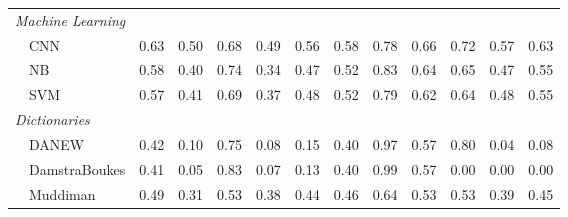 \begin{tabularx}{\textwidth}{lXXrrrrrrrrrrr}
\multicolumn{11}{l}{\emph{ Machine Learning }} \\

 & \multicolumn{2}{l}{ CNN }& \cellcolor[gray]{0.68} 0.63& \cellcolor[gray]{0.75} 0.50& \cellcolor[gray]{0.66} 0.68& \cellcolor[gray]{0.76} 0.49& \cellcolor[gray]{0.72} 0.56& \cellcolor[gray]{0.71} 0.58& \cellcolor[gray]{0.61} 0.78& \cellcolor[gray]{0.67} 0.66& \cellcolor[gray]{0.64} 0.72& \cellcolor[gray]{0.71} 0.57& \cellcolor[gray]{0.68} 0.63\\

 & \multicolumn{2}{l}{ NB }& \cellcolor[gray]{0.71} 0.58& \cellcolor[gray]{0.80} 0.40& \cellcolor[gray]{0.63} 0.74& \cellcolor[gray]{0.83} 0.34& \cellcolor[gray]{0.77} 0.47& \cellcolor[gray]{0.74} 0.52& \cellcolor[gray]{0.58} 0.83& \cellcolor[gray]{0.68} 0.64& \cellcolor[gray]{0.67} 0.65& \cellcolor[gray]{0.76} 0.47& \cellcolor[gray]{0.73} 0.55\\

 & \multicolumn{2}{l}{ SVM }& \cellcolor[gray]{0.71} 0.57& \cellcolor[gray]{0.80} 0.41& \cellcolor[gray]{0.65} 0.69& \cellcolor[gray]{0.82} 0.37& \cellcolor[gray]{0.76} 0.48& \cellcolor[gray]{0.74} 0.52& \cellcolor[gray]{0.61} 0.79& \cellcolor[gray]{0.69} 0.62& \cellcolor[gray]{0.68} 0.64& \cellcolor[gray]{0.76} 0.48& \cellcolor[gray]{0.72} 0.55\\


\multicolumn{11}{l}{\emph{ Dictionaries }} \\

 & \multicolumn{2}{l}{ DANEW }& \cellcolor[gray]{0.79} 0.42& \cellcolor[gray]{0.95} 0.10& \cellcolor[gray]{0.62} 0.75& \cellcolor[gray]{0.96} 0.08& \cellcolor[gray]{0.93} 0.15& \cellcolor[gray]{0.80} 0.40& \cellcolor[gray]{0.51} 0.97& \cellcolor[gray]{0.72} 0.57& \cellcolor[gray]{0.60} 0.80& \cellcolor[gray]{0.98} 0.04& \cellcolor[gray]{0.96} 0.08\\

 & \multicolumn{2}{l}{ DamstraBoukes }& \cellcolor[gray]{0.80} 0.41& \cellcolor[gray]{0.97} 0.05& \cellcolor[gray]{0.58} 0.83& \cellcolor[gray]{0.97} 0.07& \cellcolor[gray]{0.94} 0.13& \cellcolor[gray]{0.80} 0.40& \cellcolor[gray]{0.50} 0.99& \cellcolor[gray]{0.72} 0.57& \cellcolor[gray]{1.00} 0.00& \cellcolor[gray]{1.00} 0.00& \cellcolor[gray]{1.00} 0.00\\

 & \multicolumn{2}{l}{ Muddiman }& \cellcolor[gray]{0.76} 0.49& \cellcolor[gray]{0.84} 0.31& \cellcolor[gray]{0.74} 0.53& \cellcolor[gray]{0.81} 0.38& \cellcolor[gray]{0.78} 0.44& \cellcolor[gray]{0.77} 0.46& \cellcolor[gray]{0.68} 0.64& \cellcolor[gray]{0.73} 0.53& \cellcolor[gray]{0.73} 0.53& \cellcolor[gray]{0.80} 0.39& \cellcolor[gray]{0.77} 0.45\\


\end{tabularx}
